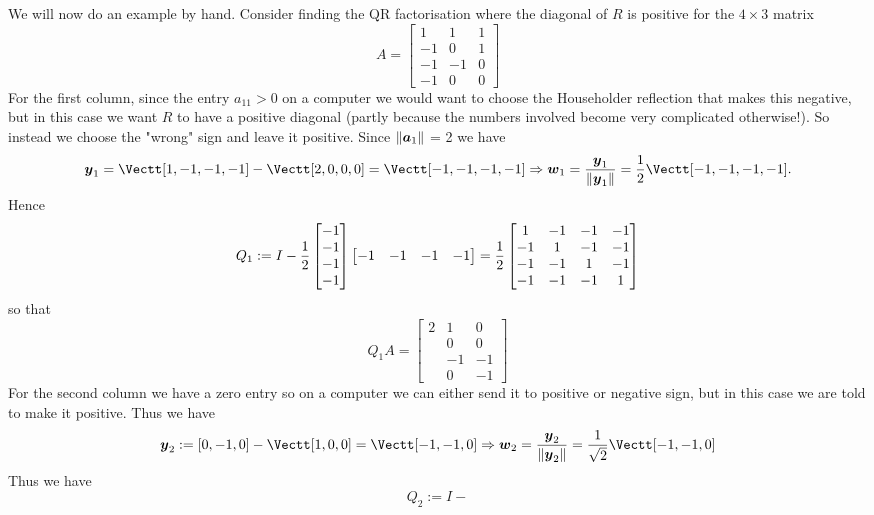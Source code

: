 \begin{example}[QR by hand] We will now do an example by hand. Consider finding the QR factorisation where the diagonal of $R$ is positive for the $4 \ensuremath{\times} 3$ matrix
\[
A = \begin{bmatrix} 
1 & 1 & 1 \\ 
-1 & 0 & 1 \\
-1 & -1 & 0 \\
-1 & 0 & 0
\end{bmatrix}
\]
For the first column, since the entry $a_{11} > 0$ on a computer  we would want to choose the Householder reflection that makes this negative, but in this case we want $R$ to have a positive diagonal (partly because the numbers involved become very complicated otherwise!). So instead we choose the "wrong" sign and leave it positive. Since $\| \bm{{\mbox{\boldmath$a$\unboldmath}}}_1 \|$ = 2 we have
\[
\ensuremath{\bm{\y}}_1 = \Vectt[1,-1,-1,-1]  -\Vectt[2,0,0,0] = \Vectt[-1,-1,-1,-1] \ensuremath{\Rightarrow} \ensuremath{\bm{\w}}_1 = {\ensuremath{\bm{\y}}_1 \over \| \ensuremath{\bm{\y}}_1 \|} = {1 \over 2} \Vectt[-1,-1,-1,-1].
\]
Hence
\[
Q_1 :=  I - {1 \over 2} \begin{bmatrix} -1 \\ -1 \\ -1 \\ -1 \end{bmatrix} \begin{bmatrix} -1 & -1 & -1 & -1 \end{bmatrix} =
 {1 \over 2} \begin{bmatrix}
1 & -1 & -1 & -1 \\
-1 & 1 & -1 & -1 \\
-1 & -1 & 1 & -1 \\
-1 & -1 & -1 &  1
\end{bmatrix}
\]
so that
\[
Q_1 A = \begin{bmatrix} 2 &  1 & 0 \\
 & 0 & 0 \\
  & -1 & -1 \\
& 0 & -1
\end{bmatrix}
\]
For the second column we have a zero entry so on a computer we can either send it to positive or negative sign,  but in this case we are told to make it positive. Thus we have
\[
\ensuremath{\bm{\y}}_2 :=   [0,-1,0] - \Vectt[1,0,0] = \Vectt[-1,-1,0]  \ensuremath{\Rightarrow} \ensuremath{\bm{\w}}_2 = {\ensuremath{\bm{\y}}_2 \over \| \ensuremath{\bm{\y}}_2 \|} = {1 \over \sqrt{2}} \Vectt[-1,-1,0]
\]
Thus we have
\[
Q_2 := I - 
\]
\end{example}
